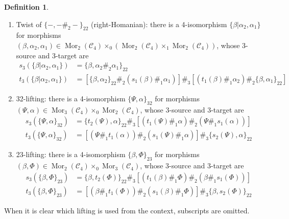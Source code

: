 \documentclass[11pt, reqno]{amsart} %
\newcommand{\mor}{{\mathop{\mathrm{Mor}}}}
\newcommand{\cC}{{\mathcal{C}}}
\theoremstyle{definition}
\newtheorem{definition}[theorem]{Definition}
\theoremstyle{remark}
\numberwithin{equation}{section}
\begin{document}
\begin{definition}
\begin{enumerate}
  \begin{align}
    \nonumber
    s_3(\{\beta_2,\beta_1|\alpha\}) &= \{\beta_2\#_2\beta_1,\alpha\}_{22} \\
    \nonumber
    t_3(\{\beta_2,\beta_1|\alpha\}) &= [(\beta_2\#_1t_1(\alpha))\#_2\{\beta_1,\alpha\}_{22}]\#_3[\{\beta_2,\alpha\}_{22}\#_2(\beta_1\#_1s_1(\alpha))]
  \end{align}
  \item Twist of $\{-,-\#_2-\}_{22}$ (right-Homanian): there is a 4-isomorphism $\{\beta|\alpha_2,\alpha_1\}$ for morphisms $(\beta,\alpha_2,\alpha_1) \in \mor_2(\cC_4)\times_0(\mor_2(\cC_4)\times_1\mor_2(\cC_4))$, whose 3-source and 3-target are
  \begin{align}
    \nonumber
    s_3(\{\beta|\alpha_2,\alpha_1\}) &= \{\beta,\alpha_2\#_2\alpha_1\}_{22} \\
    \nonumber
    t_3(\{\beta|\alpha_2,\alpha_1\}) &= [\{\beta,\alpha_2\}_{22}\#_2(s_1(\beta)\#_1\alpha_1)]\#_3[(t_1(\beta)\#_1\alpha_2)\#_2\{\beta,\alpha_1\}_{22}]
  \end{align}
  \item 32-lifting: there is a 4-isomorphism $\{\Psi,\alpha\}_{32}$ for morphisms $(\Psi,\alpha) \in \mor_3(\cC_4)\times_0\mor_2(\cC_4)$, whose 3-source and 3-target are
  \begin{align}
    \nonumber
    s_3(\{\Psi,\alpha\}_{32}) &= \{t_2(\Psi),\alpha\}_{22}\#_3[(t_1(\Psi)\#_1\alpha)\#_2(\Psi\#_1s_1(\alpha))] \\
    \nonumber
    t_3(\{\Psi,\alpha\}_{32}) &= [(\Psi\#_1t_1(\alpha))\#_2(s_1(\Psi)\#_1\alpha)]\#_3\{s_2(\Psi),\alpha\}_{22}
  \end{align}
  \item 23-lifting: there is a 4-isomorphism $\{\beta,\Phi\}_{23}$ for morphisms $(\beta,\Phi) \in \mor_2(\cC_4)\times_0\mor_3(\cC_4)$, whose 3-source and 3-target are
  \begin{align}
    \nonumber
    s_3(\{\beta,\Phi\}_{23}) &= \{\beta,t_2(\Phi)\}_{22}\#_3[(t_1(\beta)\#_1\Phi)\#_2(\beta\#_1s_1(\Phi))] \\
    \nonumber
    t_3(\{\beta,\Phi\}_{23}) &= [(\beta\#_1t_1(\Phi))\#_2(s_1(\beta)\#_1\Phi)]\#_3\{\beta,s_2(\Phi)\}_{22}
  \end{align}
\end{enumerate}
When it is clear which lifting is used from the context, subscripts are omitted. 


\end{definition}
\end{document}
